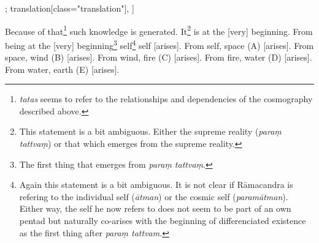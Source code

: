 \begin{alignment}[
  texts=edition[class="edition"];
  translation[class="translation"],
  ]
\begin{translation}
\begin{tlate}[p49_02]
Because of that\footnote{\textit{tatas} seems to refer to the relationships and dependencies of the cosmography described above.} such knowledge is generated. It\footnote{This statement is a bit ambiguous. Either the supreme reality (\textit{paraṃ tattvaṃ}) or that which emerges from the supreme reality.} is at the [very] beginning. From being at the [very] beginning\footnote{The first thing that emerges from \textit{paraṃ tattvaṃ}.} self\footnote{Again this statement is a bit ambiguous. It is not clear if Rāmacandra is refering to the individual self (\textit{ātman}) or the cosmic self (\textit{paramātman}). Either way, the self he now refers to does not seem to be part of an own pentad but naturally co-arises with the beginning of differenciated existence as the first thing after \textit{paraṃ tattvam}.} self [arises]. From self, space (A) [arises]. From space, wind (B) [arises]. From wind, fire (C) [arises]. From fire, water (D) [arises]. From water, earth (E) [arises]. 
\flushpage
    \end{tlate}
  \end{translation}
\end{alignment}
\pagebreak %
